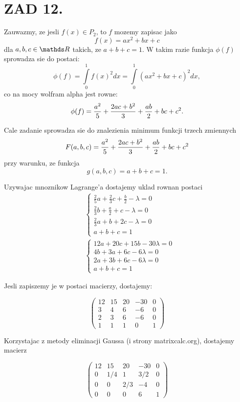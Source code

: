 \documentclass{article}[13pt]
\begin{document}
    \section{ZAD 12.}

    Zauwazmy, ze jesli $f(x)\in P_2$, to $f$ mozemy zapisac jako
    $$f(x)=ax^2+bx+c$$
    dla $a,b,c\in\R$ takich, ze $a+b+c=1$. W takim razie funkcja $\phi(f)$ sprowadza sie do postaci:
    $$\phi(f)=\int\limits_0^1f(x)^2dx=\int\limits_0^1(ax^2+bx+c)^2dx,$$
    co na mocy wolfram alpha jest rowne:
    $$\phi(f)={a^2\over5}+{2ac+b^2\over3}+{ab\over2}+bc+c^2.$$

    Cale zadanie sprowadza sie do znalezienia minimum funkcji trzech zmiennych
    $$F(a,b,c)={a^2\over5}+{2ac+b^2\over3}+{ab\over2}+bc+c^2$$
    przy warunku, ze funkcja
    $$g(a,b,c)=a+b+c=1.$$

    Uzywajac mnoznikow Lagrange'a dostajemy uklad rownan postaci
    \begin{align*}
        &\begin{cases}
            \frac25a+\frac23c+\frac b2-\lambda=0\\
            \frac23b+\frac a2+c-\lambda=0\\
            \frac23a+b+2c-\lambda=0\\
            a+b+c=1
        \end{cases}\\
        &\begin{cases}
            12a+20c+15b-30\lambda=0\\
            4b+3a+6c-6\lambda=0\\
            2a+3b+6c-6\lambda=0\\
            a+b+c=1
        \end{cases}
    \end{align*}

    Jesli zapiszemy je w postaci macierzy, dostajemy:
    
    $$
        \begin{pmatrix}
            12 &15& 20& -30& 0\\
            3 & 4& 6& -6& 0\\
            2 &3& 6& -6& 0\\
            1& 1& 1& 0& 1
        \end{pmatrix}
    $$

    Korzystajac z metody eliminacji Gaussa (i strony matrixcalc.org), dostajemy macierz

    $$
        \begin{pmatrix}
            12&	 15	& 20	&-30&	0\\
            0	&1/4	& 1&	3/2&	0\\
            0	&  0	&2/3	& -4	&0\\
            0&	  0	&  0	&  6 &	1
        \end{pmatrix}
    $$
\end{document}
